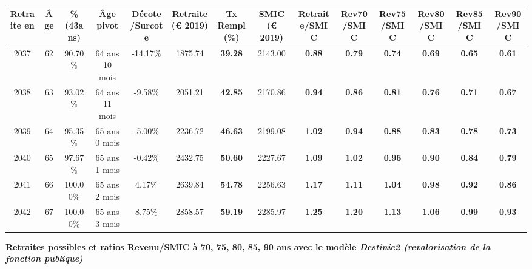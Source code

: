\begin{adjustbox}{max width=\textwidth} 
\begin{tabular}[htb]{|c|c||c|c|c||c|c||c||c|c|c|c|c|c|} 
\hline 
 Retraite en &  Âge &  \%(43ans) &  Âge pivot &  Décote/Surcote &  Retraite (\euro{} 2019) &  Tx Rempl(\%) &  SMIC (\euro{} 2019) &  Retraite/SMIC &  Rev70/SMIC &  Rev75/SMIC &  Rev80/SMIC &  Rev85/SMIC &  Rev90/SMIC \\ 
\hline \hline 
 2037 &  62 &  90.70\% &  64 ans 10 mois &  -14.17\% &  1875.74 &  {\bf 39.28} &  2143.00 &  {\bf {\color{red} 0.88}} &  {\bf {\color{red} 0.79}} &  {\bf {\color{red} 0.74}} &  {\bf {\color{red} 0.69}} &  {\bf {\color{red} 0.65}} &  {\bf {\color{red} 0.61}} \\ 
\hline 
 2038 &  63 &  93.02\% &  64 ans 11 mois &  -9.58\% &  2051.21 &  {\bf 42.85} &  2170.86 &  {\bf {\color{red} 0.94}} &  {\bf {\color{red} 0.86}} &  {\bf {\color{red} 0.81}} &  {\bf {\color{red} 0.76}} &  {\bf {\color{red} 0.71}} &  {\bf {\color{red} 0.67}} \\ 
\hline 
 2039 &  64 &  95.35\% &  65 ans 0 mois &  -5.00\% &  2236.72 &  {\bf 46.63} &  2199.08 &  {\bf 1.02} &  {\bf {\color{red} 0.94}} &  {\bf {\color{red} 0.88}} &  {\bf {\color{red} 0.83}} &  {\bf {\color{red} 0.78}} &  {\bf {\color{red} 0.73}} \\ 
\hline 
 2040 &  65 &  97.67\% &  65 ans 1 mois &  -0.42\% &  2432.75 &  {\bf 50.60} &  2227.67 &  {\bf 1.09} &  {\bf 1.02} &  {\bf {\color{red} 0.96}} &  {\bf {\color{red} 0.90}} &  {\bf {\color{red} 0.84}} &  {\bf {\color{red} 0.79}} \\ 
\hline 
 2041 &  66 &  100.00\% &  65 ans 2 mois &  4.17\% &  2639.84 &  {\bf 54.78} &  2256.63 &  {\bf 1.17} &  {\bf 1.11} &  {\bf 1.04} &  {\bf {\color{red} 0.98}} &  {\bf {\color{red} 0.92}} &  {\bf {\color{red} 0.86}} \\ 
\hline 
 2042 &  67 &  100.00\% &  65 ans 3 mois &  8.75\% &  2858.57 &  {\bf 59.19} &  2285.97 &  {\bf 1.25} &  {\bf 1.20} &  {\bf 1.13} &  {\bf 1.06} &  {\bf {\color{red} 0.99}} &  {\bf {\color{red} 0.93}} \\ 
\hline 
\hline 
\end{tabular} 
\end{adjustbox} 
 
 \vspace{0.1cm} 
{\bf \noindent Retraites possibles et ratios Revenu/SMIC à 70, 75, 80, 85, 90 ans avec le modèle \emph{Destinie2 (revalorisation de la fonction publique)}}  
 
